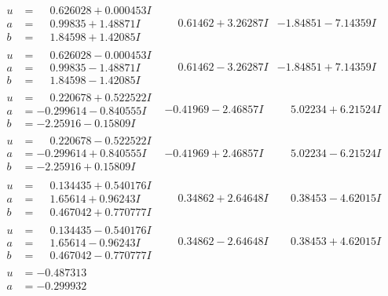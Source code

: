 \documentclass[1p]{elsarticle_modified}
\theoremstyle{definition}
\begin{document}
$$\begin{array}{c|c|c}
\begin{aligned}
u &= \phantom{-}0.626028 + 0.000453 I \\
a &= \phantom{-}0.99835 + 1.48871 I \\
b &= \phantom{-}1.84598 + 1.42085 I\end{aligned}
 & \phantom{-}0.61462 + 3.26287 I & -1.84851 - 7.14359 I \\ \hline\begin{aligned}
u &= \phantom{-}0.626028 - 0.000453 I \\
a &= \phantom{-}0.99835 - 1.48871 I \\
b &= \phantom{-}1.84598 - 1.42085 I\end{aligned}
 & \phantom{-}0.61462 - 3.26287 I & -1.84851 + 7.14359 I \\ \hline\begin{aligned}
u &= \phantom{-}0.220678 + 0.522522 I \\
a &= -0.299614 - 0.840555 I \\
b &= -2.25916 - 0.15809 I\end{aligned}
 & -0.41969 - 2.46857 I & \phantom{-}5.02234 + 6.21524 I \\ \hline\begin{aligned}
u &= \phantom{-}0.220678 - 0.522522 I \\
a &= -0.299614 + 0.840555 I \\
b &= -2.25916 + 0.15809 I\end{aligned}
 & -0.41969 + 2.46857 I & \phantom{-}5.02234 - 6.21524 I \\ \hline\begin{aligned}
u &= \phantom{-}0.134435 + 0.540176 I \\
a &= \phantom{-}1.65614 + 0.96243 I \\
b &= \phantom{-}0.467042 + 0.770777 I\end{aligned}
 & \phantom{-}0.34862 + 2.64648 I & \phantom{-}0.38453 - 4.62015 I \\ \hline\begin{aligned}
u &= \phantom{-}0.134435 - 0.540176 I \\
a &= \phantom{-}1.65614 - 0.96243 I \\
b &= \phantom{-}0.467042 - 0.770777 I\end{aligned}
 & \phantom{-}0.34862 - 2.64648 I & \phantom{-}0.38453 + 4.62015 I \\ \hline\begin{aligned}
u &= -0.487313\phantom{ +0.000000I} \\
a &= -0.299932\phantom{ +0.000000I} \\

\end{aligned}
\end{array}$$
\end{document}

